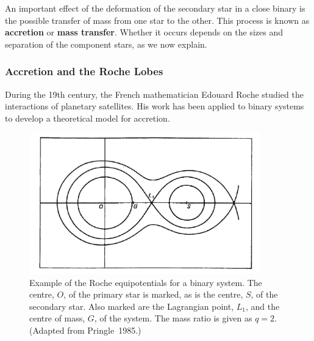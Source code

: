 An important effect of the deformation of the secondary star in a close binary is the possible transfer of mass from one star to the other. This process is known as \textbf{accretion} or \textbf{mass transfer}. Whether it occurs depends on the sizes and separation of the component stars, as we now explain.%


\subsubsection{Accretion and the Roche Lobes}\label{cha:Introduction:sec:BinaryStarSystems:subsec:Accretion:subsubsec:RocheLobes}

During the 19th century, the French mathematician Edouard Roche
studied the interactions of planetary satellites. %
His work has been applied to binary systems to develop a theoretical
model for accretion.

\begin{figure}[!htb]
\begin{center}
\includegraphics[width=10.0cm]{PringleRoche}
\caption{%
Example of the Roche equipotentials for a binary system.  The centre,
$O$, of the primary star is marked, as is
the centre, $S$, of the secondary star.  Also marked are
the Lagrangian point, $L_1$, and the centre of mass, $G$, of the
system. The mass ratio is given as $q = 2$. %
(Adapted from Pringle~1985.)%
}\label{cha:Introduction:sec:BinaryStarSystems:subsec:Accretion:subsubsec:RocheLobes:fig:PringleRoche}
\end{center}
\end{figure}
\nocite{Pringle:1985} %

\vspace{\myparskip}

